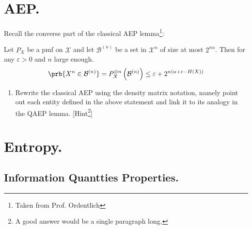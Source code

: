 \documentclass[12pt,a4paper]{article}
\begin{document}
\section{AEP.}
Recall the converse part of the classical AEP lemma\footnote{Taken from Prof. Ordentlich}:
\begin{lemma}
  Let $P_X$ be a pmf on $\mathcal{X}$ and let $\mathcal{B}^{(n)}$ be a set in $\mathcal{X}^n$ of size at most $2^{n\alpha}$. Then for any $\varepsilon > 0$ and $n$ large enough. 
  \begin{equation*}
    \begin{split}
      \prb{X^n \in \mathcal{B}^{(n)}} = P^{\otimes n}_{X}\left( \mathcal{B}^{(n)} \right) \le \varepsilon + 2^{n(\alpha + \varepsilon - H(X))}
    \end{split}
  \end{equation*}
\end{lemma}
\begin{enumerate} 
  \item Rewrite the classical AEP using the density matrix notation, namely point out each entity defined in the above statement and link it to its analogy in the QAEP lemma. [Hint\footnote{A good answer would be a single paragraph long.}]
\end{enumerate}


\section{Entropy.}

\subsection{Information Quantties Properties. } 
\end{document}
